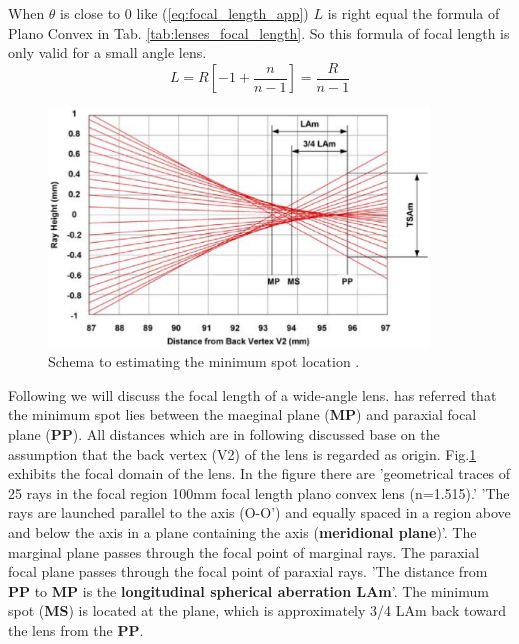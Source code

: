 When $\theta$ is close to 0 like (\ref{eq:focal_length_app}) $L$ is right equal the formula of Plano Convex in Tab. \ref{tab:lenses_focal_length}. So this formula of focal length is only valid for a small angle lens. 
\begin{equation}
L=R\left[ -1+\frac{n}{n-1}\right]=\frac{R}{n-1}
\label{eq:focal_length_app}
\end{equation}
\begin{figure}[!ht]
\centering
\includegraphics[width=0.9\textwidth]{bilder/min_max_spot}
\caption{Schema to estimating the minimum spot location \cite{lens_theory_LC_Ltd}.}
\label{fig:min_max_spot}
\end{figure}

Following we will discuss the focal length of a wide-angle lens. \cite{lens_theory_LC_Ltd} has referred that the minimum spot lies between the maeginal plane (\textbf{MP}) and paraxial focal plane (\textbf{PP}). All distances which are in following discussed base on the assumption that the back vertex (V2) of the lens is regarded as origin. Fig.\ref{fig:min_max_spot} exhibits the focal domain of the lens. In the figure there are 'geometrical traces of 25 rays in the focal region 100mm focal length plano convex lens (n=1.515).'  'The rays are launched parallel to the axis (O-O') and equally spaced in a region above and below the axis in a plane containing the axis (\textbf{meridional plane})'. The marginal plane  passes through the focal point of marginal rays. The paraxial focal plane  passes through the focal point of paraxial rays. 'The distance from \textbf{PP} to \textbf{MP} is the \textbf{longitudinal spherical aberration LAm}'. The minimum spot (\textbf{MS}) is located at the plane, which is approximately 3/4 LAm back toward the lens from the \textbf{PP}.\\
